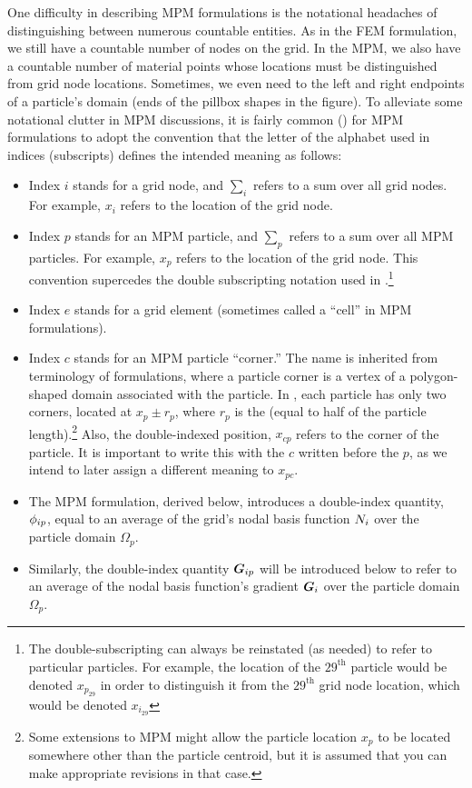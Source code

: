 One difficulty in describing MPM formulations is the notational headaches of distinguishing between numerous countable entities. As in the FEM formulation, we still have a countable number of nodes on the grid. In the MPM, we also have a countable number of material points whose locations must be distinguished from grid node locations. Sometimes, we even need to the left and right endpoints of a particle's domain (ends of the pillbox shapes in the figure). To alleviate some notational clutter in MPM discussions, it is fairly common (\cf \cite{Bardenhagen2004}) for MPM formulations to adopt the convention that the letter of the alphabet used in indices (subscripts) defines the intended meaning as follows:
\begin{itemize}
  \item Index $i$ stands for a grid node, and $\sum_i$ refers to a sum over all grid nodes. For example, $x_i$ refers to the location of the \ith grid node.
  \item Index $p$ stands for an MPM particle, and $\sum_p$ refers to a sum over all MPM particles.  For example, $x_p$ refers to the location of the \pth grid node. This convention supercedes the double subscripting notation used in .\footnote{The double-subscripting can always be reinstated (as needed) to refer to particular particles. For example, the location of the $29^\text{th}$ particle would be denoted $x_{p_{29}}$ in order to distinguish it from the $29^\text{th}$ grid node location, which would be denoted $x_{i_{29}}$}
  \item Index $e$ stands for a grid element (sometimes called a ``cell'' in MPM formulations).
  \item Index $c$ stands for an MPM particle ``corner.''  The name  is inherited from terminology of \twoD formulations, where a particle corner is a vertex of a polygon-shaped domain associated with the particle. In \oneD, each particle has only two corners, located at $x_p\pm r_p$, where $r_p$ is the  (equal to half of the particle length).\footnote{Some extensions to MPM might allow the particle location $x_p$ to be located somewhere other than the particle centroid, but it is assumed that you can make appropriate revisions in that case.} Also, the double-indexed position, $x_{cp}$ refers to the \cth corner of the \pth particle.  It is important to write this with the $c$ written before the $p$, as we intend to later assign a different meaning to $x_{pc}$.
  \item The MPM formulation, derived below, introduces a double-index quantity, ${\phi_{ip}}$, equal to an average of the grid's \ith nodal basis function ${N}_i$ over the \pth particle domain $\Omega_p$.
  \item Similarly, the double-index quantity ${\bm{G}_{ip}}$ will be introduced below to refer to an average of the \ith nodal basis function's gradient $\bm{G}_i$ over the \pth particle domain $\Omega_p$.
\end{itemize}

